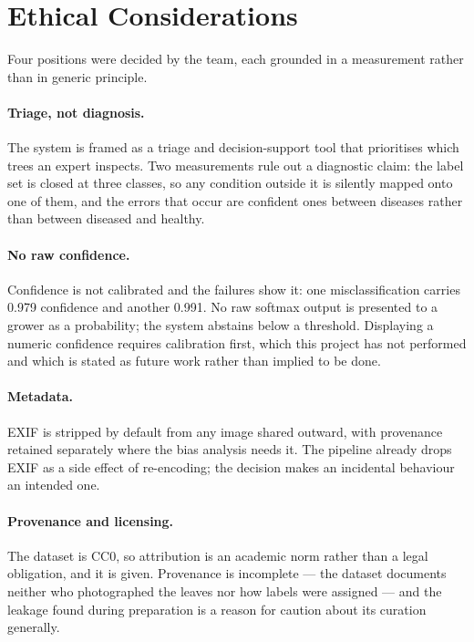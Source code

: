 \documentclass[sigconf,nonacm]{acmart}
\begin{document}
\section{Ethical Considerations}

Four positions were decided by the team, each grounded in a measurement rather
than in generic principle.

\paragraph{Triage, not diagnosis.} The system is framed as a triage and
decision-support tool that prioritises which trees an expert inspects. Two
measurements rule out a diagnostic claim: the label set is closed at three
classes, so any condition outside it is silently mapped onto one of them, and the
errors that occur are confident ones between diseases rather than between
diseased and healthy.

\paragraph{No raw confidence.} Confidence is not calibrated and the failures show
it: one misclassification carries 0.979 confidence and another 0.991. No raw
softmax output is presented to a grower as a probability; the system abstains
below a threshold. Displaying a numeric confidence requires calibration first,
which this project has not performed and which is stated as future work rather
than implied to be done.

\paragraph{Metadata.} EXIF is stripped by default from any image shared outward,
with provenance retained separately where the bias analysis needs it. The
pipeline already drops EXIF as a side effect of re-encoding; the decision makes
an incidental behaviour an intended one.

\paragraph{Provenance and licensing.} The dataset is CC0, so attribution is an
academic norm rather than a legal obligation, and it is given. Provenance is
incomplete --- the dataset documents neither who photographed the leaves nor how
labels were assigned --- and the leakage found during preparation is a reason for
caution about its curation generally.
\end{document}
